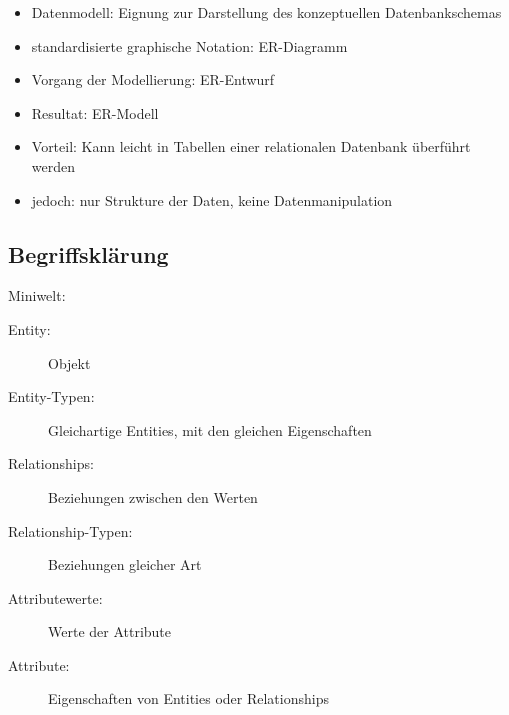\documentclass{lehramt-informatik-haupt}
\begin{document}
\begin{itemize}
\item Datenmodell: Eignung zur Darstellung des konzeptuellen
Datenbankschemas
\item standardisierte graphische Notation: ER-Diagramm
\item Vorgang der Modellierung: ER-Entwurf
\item Resultat: ER-Modell
\item Vorteil: Kann leicht in Tabellen einer relationalen Datenbank
überführt werden
\item jedoch: nur Strukture der Daten, keine Datenmanipulation
\end{itemize}

\subsection{Begriffsklärung}

Miniwelt:

\begin{description}
\item[Entity:] Objekt

\item[Entity-Typen:] Gleichartige Entities, mit den gleichen
Eigenschaften


\item[Relationships:] Beziehungen zwischen den Werten

\item[Relationship-Typen:] Beziehungen gleicher Art


\item[Attributewerte:] Werte der Attribute

\item[Attribute:] Eigenschaften von Entities oder Relationships

\end{description}
\end{document}
